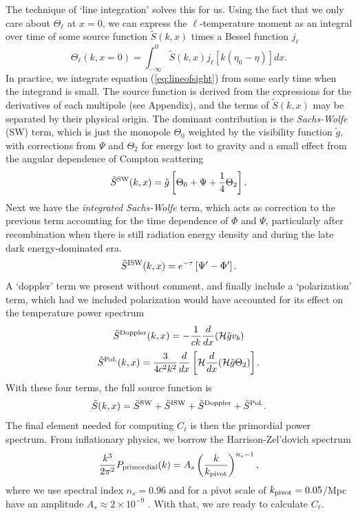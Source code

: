 \documentclass[aps,prl,twocolumn,groupedaddress,nofootinbib]{revtex4-2}
\begin{document}
The technique of `line integration' solves this for us. Using the fact that we only care about $\Theta_\ell$ at $x = 0$, we can express the $\ell$-temperature moment as an integral over time of some source function $\tilde{S}(k,x)$ times a Bessel function $j_\ell$
\begin{equation}
    \Theta_\ell(k, x=0) = \int_{-\infty}^{0} \tilde{S}(k,x) j_\ell[k(\eta_0-\eta)] dx.
    \label{eq:lineofsight}
\end{equation}
In practice, we integrate equation (\ref{eq:lineofsight}) from some early time when the integrand is small. The source function is derived from the expressions for the derivatives of each multipole (see Appendix), and the terms of $\tilde{S}(k,x)$ may be separated by their physical origin. The dominant contribution is the \textit{Sachs-Wolfe} (SW) term, which is just the monopole $\Theta_0$ weighted by the visibility function $\tilde{g}$, with corrections from $\Psi$ and $\Theta_2$ for energy lost to gravity and a small effect from the angular dependence of Compton scattering
\begin{equation}
    \tilde{S}^{\rm{SW}}(k,x) = \tilde{g}\left[ \Theta_0 + \Psi + \frac{1}{4}\Theta_2\right].
    \label{eq:sw}
\end{equation}
Next we have the \textit{integrated Sachs-Wolfe} term, which acts as correction to the previous term accounting for the time dependence of $\Phi$ and $\Psi$, particularly after recombination when there is still radiation energy density and during the late dark energy-dominated era.
\begin{equation}
    \tilde{S}^{\rm{ISW}}(k,x)=e^{-\tau} \left[\Psi^\prime-\Phi^\prime\right].
    \label{eq:isw}
\end{equation}
A `doppler' term we present without comment, and finally include a `polarization' term, which had we included polarization would have accounted for its effect on the temperature power spectrum
\begin{equation}
    \tilde{S}^{\rm{Doppler}}(k,x)=-\frac{1}{ck}\frac{d}{dx}(\mathcal{H}\tilde{g}v_b)
    \label{eq:doppler}
\end{equation}
\begin{equation}
    \tilde{S}^{\rm{Pol.}}(k,x) = \frac{3}{4c^2k^2} \frac{d}{dx}\left[\mathcal{H}\frac{d}{dx} (\mathcal{H}\tilde{g}\Theta_2)\right].
    \label{eq:pol_s}
\end{equation}
With these four terms, the full source function is
\begin{equation}
    \tilde{S}(k,x) = \tilde{S}^{\rm{SW}} + \tilde{S}^{\rm{ISW}} + \tilde{S}^{\rm{Doppler}} + \tilde{S}^{\rm{Pol.}}.
    \label{eq:source}
\end{equation}
The final element needed for computing $C_\ell$ is then the primordial power spectrum. From inflationary physics, we borrow the Harrison-Zel'dovich spectrum
\begin{equation}
    \frac{k^3}{2\pi^2} P_{\rm{primordial}}(k) = A_s \left(\frac{k}{k_{\rm{pivot}}}\right)^{n_s-1},
\end{equation}
where we use spectral index $n_s=0.96$ and for a pivot scale of $k_{\rm{pivot}}=0.05$/Mpc have an amplitude $A_s\approx 2\times10^{-9}$ \cite{winther}. With that, we are ready to calculate $C_\ell$.
\end{document}
